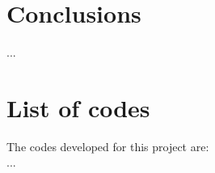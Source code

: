 \documentclass{article}
\begin{document}
\section{Conclusions}
...





\section{List of codes}

The codes developed for this project are:\\
...

\end{document}
